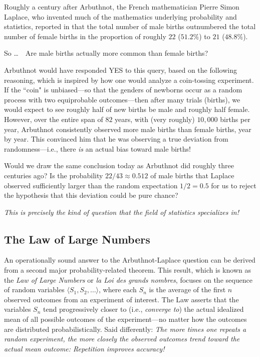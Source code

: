 \smallskip

Roughly a century after Arbuthnot, the French mathematician Pierre Simon Laplace, who invented much of the mathematics underlying probability and statistics, reported in \cite{Laplace} that the total number of male births outnumbered the total number of female births in the proportion of roughly $22$ ($51.2\%$) to $21$ ($48.8\%$).

\bigskip

\noindent
So \ldots \ \ Are male births actually more common than female births?

\bigskip


\noindent
Arbuthnot would have responded YES to this query, based on the following reasoning, which is inspired by how one would analyze a coin-tossing experiment.  If the ``coin" is unbiased---so that  the genders of newborns occur as a random process with two equiprobable outcomes---then after many trials (births), we would expect to see roughly half of new births be male and roughly half female.  However, over the entire span of $82$ years, with (very roughly) $10,000$ births per year, Arbuthnot consistently observed more male births than female births, year by year.  This convinced him that he was observing a true deviation from randomness---i.e., there {\em is} an actual bias toward male births!

\medskip

Would we draw the same conclusion today as Arbuthnot did roughly three centuries ago?  Is the probability $22/43 \approx 0.512$ of male births that Laplace observed sufficiently larger than the random expectation $1/2 = 0.5$ for us to reject the hypothesis that this deviation could be pure chance?

\medskip

{\em This is precisely the kind of question that the field of statistics specializes in!}

\subsection{The Law of Large Numbers}
\label{sec:Large-Numbers}

 

An operationally sound answer to the Arbuthnot-Laplace question can be derived from a second major probability-related theorem.  This result, which is known as the {\it Law of Large Numbers} or {\it la Loi des grands nombres}, focuses on the sequence of random variables $\langle S_1, S_2, \ldots \rangle$, where each $S_n$ is the average of the first $n$ observed outcomes from an experiment of interest.  The Law asserts that the variables $S_n$ tend progressively closer to (i.e., {\em converge to}) the actual idealized mean of all possible outcomes of the experiment---no matter how the outcomes are distributed probabilistically.  Said differently: {\em The more times one repeats a random experiment, the more closely the observed outcomes trend toward the actual mean outcome:  Repetition improves accuracy!}

